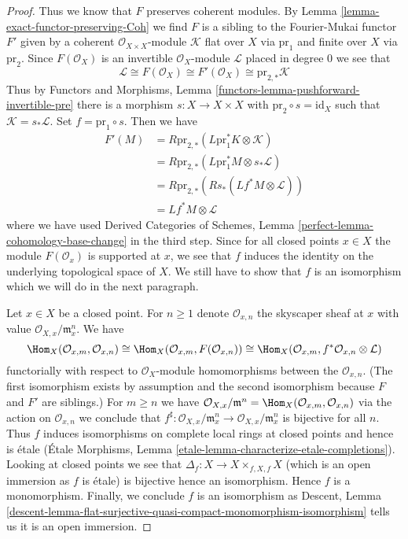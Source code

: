 \begin{proof}
\medskip\noindent
Thus we know that $F$ preserves coherent modules. By
Lemma \ref{lemma-exact-functor-preserving-Coh}
we find $F$ is a sibling to the Fourier-Mukai functor $F'$ given by
a coherent $\mathcal{O}_{X \times X}$-module $\mathcal{K}$
flat over $X$ via $\text{pr}_1$ and finite over $X$ via $\text{pr}_2$.
Since $F(\mathcal{O}_X)$ is an invertible $\mathcal{O}_X$-module
$\mathcal{L}$ placed in degree $0$ we see that
$$
\mathcal{L} \cong F(\mathcal{O}_X) \cong F'(\mathcal{O}_X) \cong
\text{pr}_{2, *}\mathcal{K}
$$
Thus by
Functors and Morphisms, Lemma \ref{functors-lemma-pushforward-invertible-pre}
there
is a morphism $s : X \to X \times X$ with $\text{pr}_2 \circ s = \text{id}_X$
such that $\mathcal{K} = s_*\mathcal{L}$. Set $f = \text{pr}_1 \circ s$.
Then we have
\begin{align*}
F'(M)
& =
R\text{pr}_{2, *}(L\text{pr}_1^*K \otimes \mathcal{K}) \\
& =
R\text{pr}_{2, *}(L\text{pr}_1^*M \otimes s_*\mathcal{L}) \\
& =
R\text{pr}_{2, *}(Rs_*(Lf^*M \otimes \mathcal{L})) \\
& =
Lf^*M \otimes \mathcal{L}
\end{align*}
where we have used
Derived Categories of Schemes, Lemma \ref{perfect-lemma-cohomology-base-change}
in the third step.
Since for all closed points $x \in X$ the module $F(\mathcal{O}_x)$
is supported at $x$, we see that $f$ induces the identity on the
underlying topological space of $X$. We still have to show that
$f$ is an isomorphism which we will do in the next paragraph.

\medskip\noindent
Let $x \in X$ be a closed point.
For $n \geq 1$ denote $\mathcal{O}_{x, n}$ the skyscaper
sheaf at $x$ with value $\mathcal{O}_{X, x}/\mathfrak m_x^n$.
We have
$$
\Hom_X(\mathcal{O}_{x, m}, \mathcal{O}_{x, n}) \cong
\Hom_X(\mathcal{O}_{x, m}, F(\mathcal{O}_{x, n})) \cong
\Hom_X(\mathcal{O}_{x, m}, f^*\mathcal{O}_{x, n} \otimes \mathcal{L})
$$
functorially with respect to $\mathcal{O}_X$-module homomorphisms
between the $\mathcal{O}_{x, n}$. (The first isomorphism exists
by assumption and the second isomorphism because $F$ and $F'$ are siblings.)
For $m \geq n$ we have $\mathcal{O}_{X, x}/\mathfrak m^n =
\Hom_X(\mathcal{O}_{x, m}, \mathcal{O}_{x, n})$
via the action on $\mathcal{O}_{x, n}$
we conclude that $f^\sharp : \mathcal{O}_{X, x}/\mathfrak m_x^n \to
\mathcal{O}_{X, x}/\mathfrak m_x^n$ is bijective for all $n$.
Thus $f$ induces isomorphisms on complete local rings at closed
points and hence is \'etale
(\'Etale Morphisms, Lemma \ref{etale-lemma-characterize-etale-completions}).
Looking at closed points we see that
$\Delta_f : X \to X \times_{f, X, f} X$ (which is an open immersion
as $f$ is \'etale) is bijective hence an isomorphism.
Hence $f$ is a monomorphism. Finally, we conclude $f$ is an isomorphism
as Descent, Lemma
\ref{descent-lemma-flat-surjective-quasi-compact-monomorphism-isomorphism}
tells us it is an open immersion.
\end{proof}

